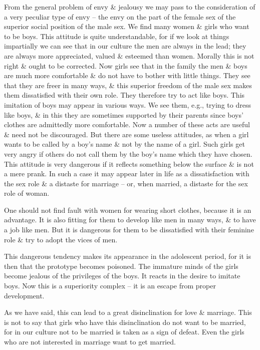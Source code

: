 \documentclass{article}
\begin{document}
From the general problem of envy \& jealousy we may pass to the consideration of a very peculiar type of envy -- the envy on the part of the female sex of the superior social position of the male sex. We find many women \& girls who want to be boys. This attitude is quite understandable, for if we look at things impartially we can see that in our culture the men are always in the lead; they are always more appreciated, valued \& esteemed than women. Morally this is not right \& ought to be corrected. Now girls see that in the family the men \& boys are much more comfortable \& do not have to bother with little things. They see that they are freer in many ways, \& this superior freedom of the male sex makes them dissatisfied with their own role. They therefore try to act like boys. This imitation of boys may appear in various ways. We see them, e.g., trying to dress like boys, \& in this they are sometimes supported by their parents since boys' clothes are admittedly more comfortable. Now a number of these acts are useful \& need not be discouraged. But there are some useless attitudes, as when a girl wants to be called by a boy's name \& not by the name of a girl. Such girls get very angry if others do not call them by the boy's name which they have chosen. This attitude is very dangerous if it reflects something below the surface \& is not a mere prank. In such a case it may appear later in life as a dissatisfaction with the sex role \& a distaste for marriage -- or, when married, a distaste for the sex role of woman.

One should not find fault with women for wearing short clothes, because it is an advantage. It is also fitting for them to develop like men in many ways, \& to have a job like men. But it is dangerous for them to be dissatisfied with their feminine role \& try to adopt the vices of men.

This dangerous tendency makes its appearance in the adolescent period, for it is then that the prototype becomes poisoned. The immature minds of the girls become jealous of the privileges of the boys. It reacts in the desire to imitate boys. Now this is a superiority complex -- it is an escape from proper development.

As we have said, this can lead to a great disinclination for love \& marriage. This is not to say that girls who have this disinclination do not want to be married, for in our culture not to be married is taken as a sign of defeat. Even the girls who are not interested in marriage want to get married.
\end{document}
